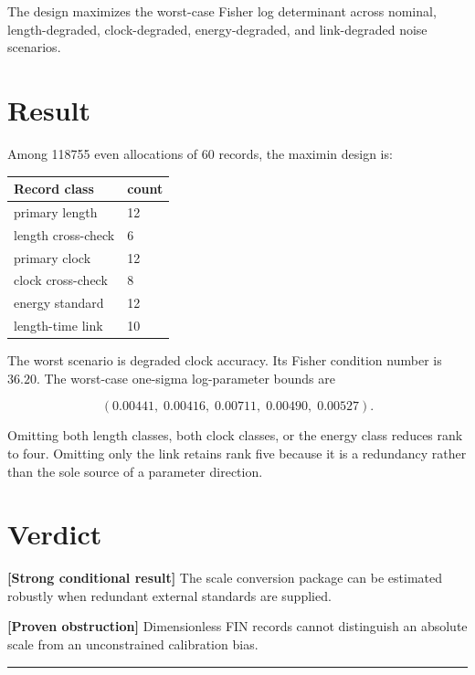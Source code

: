\documentclass[11pt,a4paper,openany]{report}
\begin{document}
The design maximizes the worst-case Fisher log determinant across nominal, length-degraded, clock-degraded, energy-degraded, and link-degraded noise scenarios.

\section{Result}

Among 118755 even allocations of 60 records, the maximin design is:

\begin{center}
\begingroup\small
\setlength{\tabcolsep}{3.5pt}
\renewcommand{\arraystretch}{1.16}
\begin{longtable}{@{}p{}p{}@{}}
\toprule
\textbf{Record class} & \textbf{count} \\
\midrule
\endhead
primary length & 12 \\
length cross-check & 6 \\
primary clock & 12 \\
clock cross-check & 8 \\
energy standard & 12 \\
length-time link & 10 \\
\bottomrule
\end{longtable}
\endgroup
\end{center}

The worst scenario is degraded clock accuracy. Its Fisher condition number is \(36.20\). The worst-case one-sigma log-parameter bounds are

\[
(0.00441,\;0.00416,\;0.00711,\;0.00490,\;0.00527).
\]

Omitting both length classes, both clock classes, or the energy class reduces rank to four. Omitting only the link retains rank five because it is a redundancy rather than the sole source of a parameter direction.

\section{Verdict}

\textbf{[Strong conditional result]} The scale conversion package can be estimated robustly when redundant external standards are supplied.

\textbf{[Proven obstruction]} Dimensionless FIN records cannot distinguish an absolute scale from an unconstrained calibration bias.

\par\medskip\hrule\medskip
\end{document}
